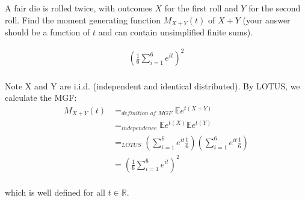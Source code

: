 
\setcounter{theorem}{12}
\begin{exercise} [BH.6.13]
    A fair die is rolled twice, with outcomes $X$ for the first roll and $Y$ for the second roll. Find the moment generating function $M_{X+Y}(t)$ of $X + Y$ (your answer should be a function of $t$ and can contain unsimplified finite sums).
\begin{solution}
    \begin{align*}
		\left(\frac{1}{6}\sum_{i=1}^{6} e^{it} \right)^2
	\end{align*}~\\
	Note X and Y are i.i.d. (independent and identical distributed). By LOTUS, we calculate the MGF:
	\begin{align*}
		M_{X+Y}(t) &=_{\textit{definition of MGF}} \mathbb{E}e^{t(X+Y)} \\&=_{\textit{independence}} \mathbb{E}e^{t(X)}\mathbb{E}e^{t(Y)} \\&=_{\textit{LOTUS}} 	\left(\sum_{i=1}^{6} e^{it} \frac{1}{6}\right)	\left( \sum_{i=1}^{6} e^{it} \frac{1}{6}\right)  \\
		&=  	\left(\frac{1}{6}\sum_{i=1}^{6} e^{it} \right)^2
	\end{align*}~\\
	which is well defined for all $t\in \mathbb{R}$. 
\end{solution}
\end{exercise}


